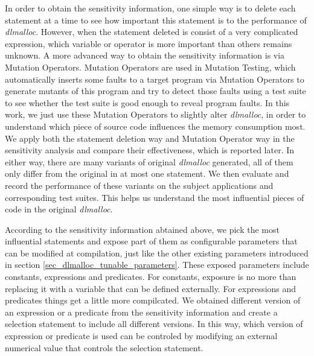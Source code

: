 In order to obtain the sensitivity information, one simple way is to delete each statement at a time to see how important this statement is to the performance of \emph{dlmalloc}. However, when the statement deleted is consist of a very complicated expression, which variable or operator is more important than others remains unknown. A more advanced way to obtain the sensitivity information is via Mutation Operators. Mutation Operators are used in Mutation Testing, which automatically inserts some faults to a target program via Mutation Operators to generate mutants of this program and try to detect those faults using a test suite to see whether the test suite is good enough to reveal program faults. In this work, we just use these Mutation Operators to slightly alter \emph{dlmalloc}, in order to understand which piece of source code influences the memory consumption most. We apply both the statement deletion way and Mutation Operator way in the sensitivity analysis and compare their effectiveness, which is reported later. In either way, there are many variants of original \emph{dlmalloc} generated, all of them only differ from the original in at most one statement. We then evaluate and record the performance of these variants on the subject applications and corresponding test suites. This helps us understand the most influential pieces of code in the original \emph{dlmalloc}.

According to the sensitivity information abtained above, we pick the most influential statements and expose part of them as configurable parameters that can be modified at compilation, just like the other existing parameters introduced in section \ref{sec_dlmalloc_tunable_parameters}. These exposed parameters include constants, expressions and predicates. For constants, exposure is no more than replacing it with a variable that can be defined externally. For expressions and predicates things get a little more compilcated. We obtained different version of an expression or a predicate from the sensitivity information and create a selection statement to include all different versions. In this way, which version of expression or predicate is used can be controled by modifying an external numerical value that controls the selection statement.


